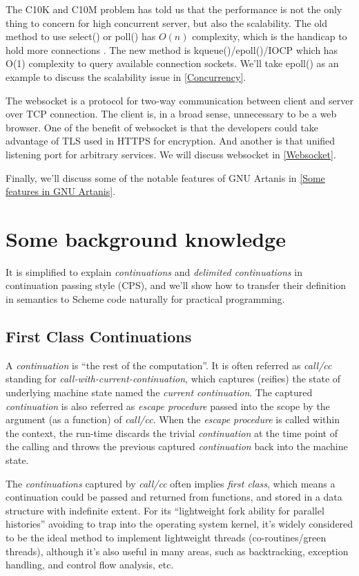 \documentclass[numbers,numberedpars]{sigplanconf}
\begin{document}
The C10K and C10M problem has told us that the performance is not the only thing to concern for high concurrent server, but also the scalability.  
The old method to use select() or poll() has $O(n)$ complexity, which is the handicap to hold more connections \citep{lemon2001kqueue}.
The new method is kqueue()/epoll()/IOCP which has O(1) complexity to query available connection sockets. We'll take epoll() as an example to
discuss the scalability issue in \ref{Concurrency}.

The websocket is a protocol for two-way communication between client and server over TCP connection. The client is, in a broad sense,
unnecessary to be a web browser. One of the benefit of websocket is that the developers could take advantage of TLS used in HTTPS for
encryption. And another is that unified listening port for arbitrary services. We will discuss websocket in \ref{Websocket}.

Finally, we'll discuss some of the notable features of GNU Artanis in \ref{Some features in GNU Artanis}.

\section{Some background knowledge}

It is simplified to explain {\it continuations} and {\it delimited continuations} in continuation passing style (CPS), and we'll show how to
transfer their definition in semantics to Scheme code naturally for practical programming.

\subsection{First Class Continuations}

A {\it continuation} is ``the rest of the computation''. It is often referred as {\it call/cc} standing for
{\it call-with-current-continuation}, which captures (reifies) the state of underlying machine state named the {\it current continuation}.
The captured {\it continuation} is also referred as {\it escape procedure} passed into the scope by the argument (as a function) of {\it call/cc}.
When the {\it escape procedure} is called within the context, the run-time discards the trivial
{\it continuation} at the time point of the calling and throws the previous captured {\it continuation} back into the machine state.

The {\it continuations} captured by {\it call/cc} often implies {\it first class}, which means a continuation
could be passed and returned from functions, and stored in a data structure with indefinite extent.
For its ``lightweight fork ability for parallel histories'' avoiding to trap into the operating system kernel, it's widely considered
to be the ideal method to implement lightweight threads (co-routines/green threads), although it's also useful in many areas, such as
backtracking, exception handling, and control flow analysis, etc.
\end{document}
